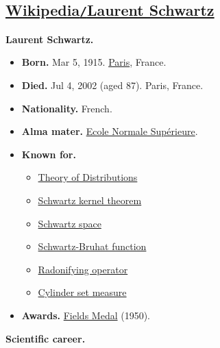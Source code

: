 \documentclass{article}
\begin{document}
\subsection{\href{https://en.wikipedia.org/wiki/Laurent_Schwartz}{Wikipedia\texttt{/}Laurent Schwartz}}
\textbf{Laurent Schwartz.}
\begin{itemize}
	\item \textbf{Born.} Mar 5, 1915. \href{https://en.wikipedia.org/wiki/Paris}{Paris}, France.
	\item \textbf{Died.} Jul 4, 2002 (aged 87). Paris, France.
	\item \textbf{Nationality.} French.
	\item \textbf{Alma mater.} \href{https://en.wikipedia.org/wiki/%C3%89cole_Normale_Sup%C3%A9rieure}{Ecole Normale Sup\'erieure}.
	\item \textbf{Known for.}
	\begin{itemize}
		\item \href{https://en.wikipedia.org/wiki/Distribution_(mathematics)}{Theory of Distributions}
		\item \href{https://en.wikipedia.org/wiki/Schwartz_kernel_theorem}{Schwartz kernel theorem}
		\item \href{https://en.wikipedia.org/wiki/Schwartz_space}{Schwartz space}
		\item \href{https://en.wikipedia.org/wiki/Schwartz-Bruhat_function}{Schwartz-Bruhat function}
		\item \href{https://en.wikipedia.org/wiki/Radonifying_function}{Radonifying operator}
		\item \href{https://en.wikipedia.org/wiki/Cylinder_set_measure}{Cylinder set measure}
	\end{itemize}
	\item \textbf{Awards.} \href{https://en.wikipedia.org/wiki/Fields_Medal}{Fields Medal} (1950).
\end{itemize}
\textbf{Scientific career.}
\end{document}
